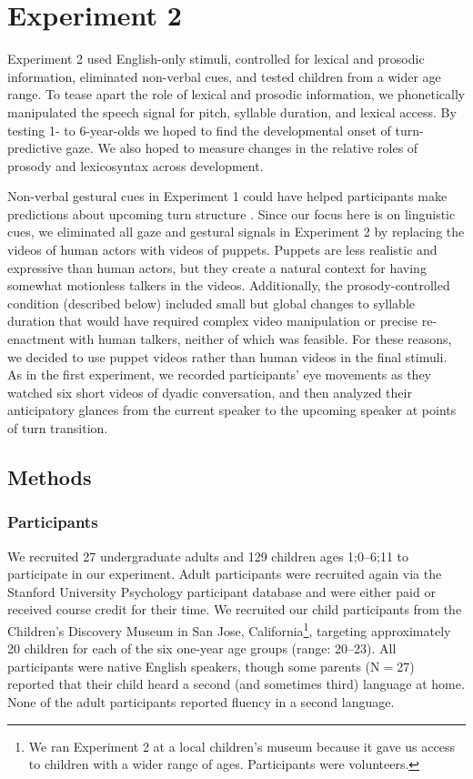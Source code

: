 \documentclass[authoryear, 12pt]{elsarticle}
\begin{document}
\section*{Experiment 2}
\label{sec:exp2}

Experiment 2 used English-only stimuli, controlled for lexical and prosodic information, eliminated non-verbal cues, and tested children from a wider age range. To tease apart the role of lexical and prosodic information, we phonetically manipulated the speech signal for pitch, syllable duration, and lexical access. By testing 1- to 6-year-olds we hoped to find the developmental onset of turn-predictive gaze. We also hoped to measure changes in the relative roles of prosody and lexicosyntax across development.

Non-verbal gestural cues in Experiment 1 could have helped participants make predictions about upcoming turn structure \citep{rossano2009, stivers2010}. Since our focus here is on linguistic cues, we eliminated all gaze and gestural signals in Experiment 2 by replacing the videos of human actors with videos of puppets. Puppets are less realistic and expressive than human actors, but they create a natural context for having somewhat motionless talkers in the videos. Additionally, the prosody-controlled condition (described below) included small but global changes to syllable duration that would have required complex video manipulation or precise re-enactment with human talkers, neither of which was feasible. For these reasons, we decided to use puppet videos rather than human videos in the final stimuli. As in the first experiment, we recorded participants' eye movements as they watched six short videos of dyadic conversation, and then analyzed their anticipatory glances from the current speaker to the upcoming speaker at points of turn transition.

\subsection*{Methods}
\label{sec:methods2}

\subsubsection*{Participants}
We recruited 27 undergraduate adults and 129 children ages 1;0--6;11 to participate in our experiment. Adult participants were recruited again via the Stanford University Psychology participant database and were either paid or received course credit for their time. We recruited our child participants from the Children's Discovery Museum in San Jose, California\footnote{We ran Experiment 2 at a local children's museum because it gave us access to children with a wider range of ages. Participants were volunteers.}, targeting approximately 20 children for each of the six one-year age groups (range: 20--23). All participants were native English speakers, though some parents (N$=$27) reported that their child heard a second (and sometimes third) language at home. None of the adult participants reported fluency in a second language.
\end{document}
